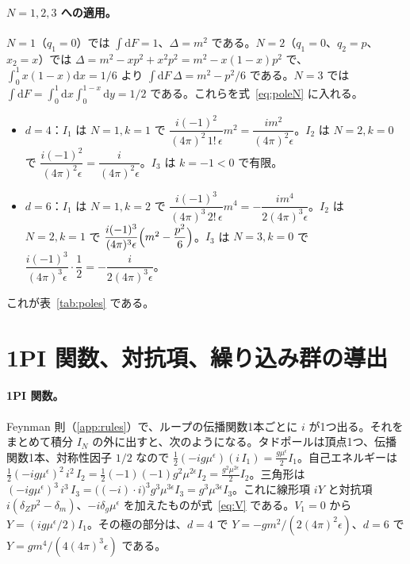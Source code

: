 \documentclass[a4paper,10pt]{ltjsarticle}
\newcommand{\dd}{\mathrm{d}}
\begin{document}
\paragraph{$N=1,2,3$ への適用。}$N=1$（$q_1=0$）では $\int\dd F=1$、$\Delta=m^2$ である。$N=2$（$q_1=0$、$q_2=p$、$x_2=x$）では $\Delta=m^2-xp^2+x^2p^2=m^2-x(1-x)p^2$ で、$\int_0^1x(1-x)\dd x=1/6$ より $\int\dd F\,\Delta=m^2-p^2/6$ である。$N=3$ では $\int\dd F=\int_0^1\dd x\int_0^{1-x}\dd y=1/2$ である。これらを式~\eqref{eq:poleN} に入れる。
\begin{itemize}
\item $d=4$：$I_1$ は $N=1,k=1$ で $\dfrac{i(-1)^2}{(4\pi)^2\,1!\,\epsilon}m^2=\dfrac{im^2}{(4\pi)^2\epsilon}$。$I_2$ は $N=2,k=0$ で $\dfrac{i(-1)^2}{(4\pi)^2\epsilon}=\dfrac{i}{(4\pi)^2\epsilon}$。$I_3$ は $k=-1<0$ で有限。
\item $d=6$：$I_1$ は $N=1,k=2$ で $\dfrac{i(-1)^3}{(4\pi)^3\,2!\,\epsilon}m^4=-\dfrac{im^4}{2(4\pi)^3\epsilon}$。$I_2$ は $N=2,k=1$ で $\dfrac{i(-1)^3}{(4\pi)^3\epsilon}\Bigl(m^2-\dfrac{p^2}{6}\Bigr)$。$I_3$ は $N=3,k=0$ で $\dfrac{i(-1)^3}{(4\pi)^3\epsilon}\cdot\dfrac12=-\dfrac{i}{2(4\pi)^3\epsilon}$。
\end{itemize}
これが表~\ref{tab:poles} である。

\section{1PI 関数、対抗項、繰り込み群の導出}\label{app:ren}

\paragraph{1PI 関数。}Feynman 則（\ref{app:rules}）で、ループの伝播関数1本ごとに $i$ が1つ出る。それをまとめて積分 $I_N$ の外に出すと、次のようになる。タドポールは頂点1つ、伝播関数1本、対称性因子 $1/2$ なので $\frac12(-ig\mu^\epsilon)(i\,I_1)=\frac{g\mu^\epsilon}{2}I_1$。自己エネルギーは $\frac12(-ig\mu^\epsilon)^2\,i^2\,I_2=\frac12(-1)(-1)g^2\mu^{2\epsilon}I_2=\frac{g^2\mu^{2\epsilon}}{2}I_2$。三角形は $(-ig\mu^\epsilon)^3\,i^3\,I_3=\bigl((-i)\cdot i\bigr)^3g^3\mu^{3\epsilon}I_3=g^3\mu^{3\epsilon}I_3$。これに線形項 $iY$ と対抗項 $i(\delta_Zp^2-\delta_m)$、$-i\delta_g\mu^\epsilon$ を加えたものが式~\eqref{eq:V} である。$V_1=0$ から $Y=(ig\mu^\epsilon/2)I_1$。その極の部分は、$d=4$ で $Y=-gm^2/(2(4\pi)^2\epsilon)$、$d=6$ で $Y=gm^4/(4(4\pi)^3\epsilon)$ である。
\end{document}
